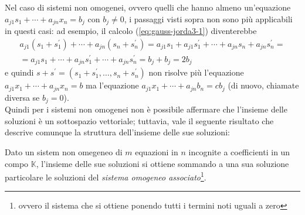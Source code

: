 Nel caso di sistemi non omogenei, ovvero quelli che hanno almeno
un'equazione $a_{j1}s_1+\cdots+a_{jn}x_n=b_j$ con $b_j\neq 0$, i passaggi
visti sopra non sono più applicabili in questi casi: ad esempio, il
calcolo (\ref{eq:gauss-jorda3-1}) diventerebbe
\begin{equation*}
  \begin{matrix}
    a_{j1}(s_1+s_1^\prime)+\cdots+a_{jn}(s_n+s_n^\prime)=a_{j1}s_1+a_{j1}
    s_1^\prime+\cdots+a_{jn}s_n+a_{jn}s_n^\prime=\\
    =a_{j1}s_1+\cdots+a_{jn}s_1^\prime+\cdots+a_{jn}s_n^\prime=b_j+b_j=2b_j
  \end{matrix}
\end{equation*}
e quindi $s+s^\prime=(s_1+s_1^\prime,\dots, s_n+s_n^\prime)$ non risolve più
l'equazione $a_{j1}x_1+\cdots+a_{jn}x_n=b$ ma l'equazione $a_{j1}x_1+\cdots
+a_{jn}b_n=cb_j$ (di nuovo, chiamate diversa se $b_j=0$).\\
Quindi per i sistemi non omogenei non è possibile affermare che l'insieme
delle soluzioni è un sottospazio vettoriale; tuttavia, vale il seguente
risultato che descrive comunque la struttura dell'insieme delle sue
soluzioni:
\begin{prop}
  \label{prop:gauss-jorda4}
  Dato un sistem non omegeneo di $m$ equazioni in $n$ incognite a
  coefficienti in un compo $\mathds{K}$, l'insieme delle sue soluzioni
  si ottiene sommando a una sua soluzione particolare le soluzioni del
  \textit{sistema omogeneo associato}\footnote{ovvero il sistema che si
  ottiene ponendo tutti i termini noti uguali a zero}.
\end{prop}
